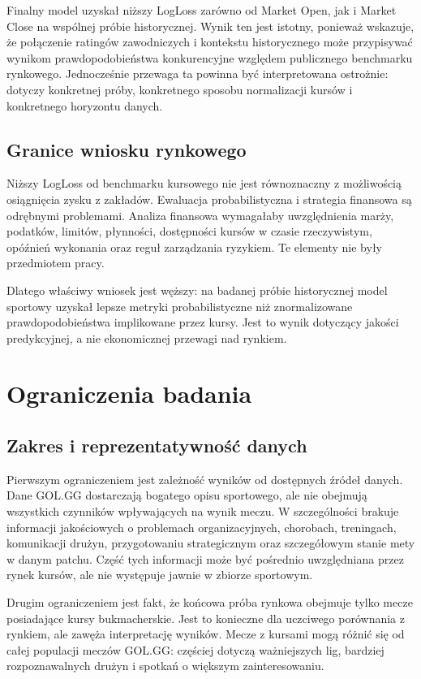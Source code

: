 Finalny model uzyskał niższy LogLoss zarówno od Market Open, jak i Market Close na wspólnej próbie
historycznej. Wynik ten jest istotny, ponieważ wskazuje, że połączenie ratingów zawodniczych i
kontekstu historycznego może przypisywać wynikom prawdopodobieństwa konkurencyjne względem
publicznego benchmarku rynkowego. Jednocześnie przewaga ta powinna być interpretowana ostrożnie:
dotyczy konkretnej próby, konkretnego sposobu normalizacji kursów i konkretnego horyzontu danych.

\subsection{Granice wniosku rynkowego}

Niższy LogLoss od benchmarku kursowego nie jest równoznaczny z możliwością osiągnięcia zysku z
zakładów. Ewaluacja probabilistyczna i strategia finansowa są odrębnymi problemami. Analiza
finansowa wymagałaby uwzględnienia marży, podatków, limitów, płynności, dostępności kursów w czasie
rzeczywistym, opóźnień wykonania oraz reguł zarządzania ryzykiem. Te elementy nie były przedmiotem
pracy.

Dlatego właściwy wniosek jest węższy: na badanej próbie historycznej model sportowy uzyskał lepsze
metryki probabilistyczne niż znormalizowane prawdopodobieństwa implikowane przez kursy. Jest to
wynik dotyczący jakości predykcyjnej, a nie ekonomicznej przewagi nad rynkiem.

\section{Ograniczenia badania}

\subsection{Zakres i reprezentatywność danych}

Pierwszym ograniczeniem jest zależność wyników od dostępnych źródeł danych. Dane GOL.GG dostarczają
bogatego opisu sportowego, ale nie obejmują wszystkich czynników wpływających na wynik meczu. W
szczególności brakuje informacji jakościowych o problemach organizacyjnych, chorobach, treningach,
komunikacji drużyn, przygotowaniu strategicznym oraz szczegółowym stanie mety w danym patchu. Część
tych informacji może być pośrednio uwzględniana przez rynek kursów, ale nie występuje jawnie w
zbiorze sportowym.

Drugim ograniczeniem jest fakt, że końcowa próba rynkowa obejmuje tylko mecze posiadające kursy
bukmacherskie. Jest to konieczne dla uczciwego porównania z rynkiem, ale zawęża interpretację
wyników. Mecze z kursami mogą różnić się od całej populacji meczów GOL.GG: częściej dotyczą
ważniejszych lig, bardziej rozpoznawalnych drużyn i spotkań o większym zainteresowaniu.

